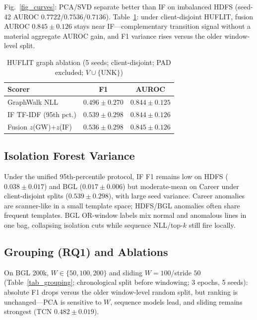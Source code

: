 \documentclass[runningheads]{llncs}
\begin{document}
Fig.~\ref{fig_curves}: PCA/SVD separate better than IF on imbalanced HDFS (seed-42 AUROC $0.7722$/$0.7536$/$0.7136$). Table~\ref{tab_graph_ablation}: under client-disjoint HUFLIT, fusion AUROC $0.845\pm0.126$ stays near IF---complementary transition signal without a material aggregate AUROC gain, and F1 variance rises versus the older window-level split.

\begin{table}[htbp]
\caption{HUFLIT graph ablation (5 seeds; client-disjoint; PAD excluded; $V\cup\{\mathrm{UNK}\}$)}
\centering
\scriptsize
\begin{tabular}{lcc}
\toprule
\textbf{Scorer} & \textbf{F1} & \textbf{AUROC} \\
\midrule
GraphWalk NLL & $0.496\pm0.270$ & $0.844\pm0.125$ \\
IF TF-IDF (95th pct.) & $0.539\pm0.298$ & $0.844\pm0.126$ \\
Fusion $z$(GW)${+}z$(IF) & $0.536\pm0.298$ & $0.845\pm0.126$ \\
\bottomrule
\end{tabular}
\label{tab_graph_ablation}
\end{table}

\subsection{Isolation Forest Variance}
Under the unified 95th-percentile protocol, IF F1 remains low on HDFS ($0.038\pm0.017$) and BGL ($0.017\pm0.006$) but moderate-mean on Career under client-disjoint splits ($0.539\pm0.298$), with large seed variance. Career anomalies are scanner-like in a small template space; HDFS/BGL anomalies often share frequent templates. BGL OR-window labels mix normal and anomalous lines in one bag, collapsing isolation cuts while sequence NLL/top-$k$ still fire locally.

\subsection{Grouping (RQ1) and Ablations}
On BGL 200k, $W\in\{50,100,200\}$ and sliding $W{=}100$/stride $50$ (Table~\ref{tab_grouping}; chronological split before windowing; 3 epochs, 5 seeds): absolute F1 drops versus the older window-level random split, but ranking is unchanged---PCA is sensitive to $W$, sequence models lead, and sliding remains strongest (TCN $0.482\pm0.019$).
\end{document}
